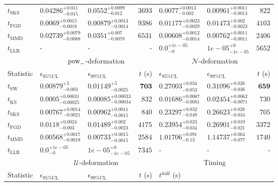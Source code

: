 \begin{tabular}{l|llr|llr}
	$t_{\mathrm{SKS}}$ & $0.04286_{-0.015}^{+0.011}$ & $0.0552_{-0.012}^{+0.0099}$ & $3693$ & $0.0077_{-0.002}^{+0.0013}$ & $0.00961_{-0.0013}^{+0.0011}$ & $822$ \\
	$t_{\mathrm{FGD}}$ & ${\mathbf{0.0069_{-0.0018}^{+0.0015}}}$ & ${\mathbf{0.00879_{-0.0014}^{+0.0013}}}$ & $9386$ & $0.01177_{-0.0029}^{+0.0023}$ & $0.01473_{-0.0023}^{+0.002}$ & $4103$ \\
	$t_{\mathrm{MMD}}$ & $0.02739_{-0.0088}^{+0.0079}$ & $0.0351_{-0.0078}^{+0.007}$ & $6531$ & $0.00608_{-0.0014}^{+0.0012}$ & $0.00762_{-0.0011}^{+0.0011}$ & $2406$ \\
	$t_{\mathrm{LLR}}$ & - & - & - & $0.0_{-0}^{+1e-05}$ & $1e-05_{-1e-05}^{+0}$ & $5652$ \\
	\toprule
	\multicolumn{1}{c}{} & \multicolumn{3}{c}{$\rm{pow}_{-}$-deformation} & \multicolumn{3}{c}{$\mathcal{N}$-deformation} \\
	Statistic & $\epsilon_{95\%\mathrm{CL}}$ & $\epsilon_{99\%\mathrm{CL}}$ & $t$ (s) & $\epsilon_{95\%\mathrm{CL}}$ & $\epsilon_{99\%\mathrm{CL}}$ & $t$ (s) \\
	\midrule
	$t_{\mathrm{SW}}$ & $0.00879_{-0.003}^{+5}$ & $0.01149_{-0.0025}^{+5}$ & ${\mathbf{703}}$ & $0.27003_{-0.053}^{+0.034}$ & $0.31096_{-0.036}^{+0.026}$ & ${\mathbf{659}}$ \\
	$t_{\overline{\mathrm{KS}}}$ & ${\mathbf{0.0005_{-0.00025}^{+0.00031}}}$ & ${\mathbf{0.00085_{-0.00034}^{+0.00033}}}$ & $832$ & ${\mathbf{0.01686_{-0.0081}^{+0.0067}}}$ & ${\mathbf{0.02454_{-0.0071}^{+0.0062}}}$ & $730$ \\
	$t_{\mathrm{SKS}}$ & $0.00767_{-0.0021}^{+0.0014}$ & $0.00962_{-0.0015}^{+0.0011}$ & $840$ & $0.23297_{-0.049}^{+0.032}$ & $0.26623_{-0.034}^{+0.028}$ & $705$ \\
	$t_{\mathrm{FGD}}$ & $0.0118_{-0.003}^{+0.0024}$ & $0.01489_{-0.0023}^{+0.002}$ & $4175$ & $0.23954_{-0.034}^{+0.023}$ & $0.26901_{-0.021}^{+0.019}$ & $3372$ \\
	$t_{\mathrm{MMD}}$ & $0.00568_{-0.0018}^{+0.0017}$ & $0.00733_{-0.0015}^{+0.0015}$ & $2584$ & $1.01706_{-0.13}^{+0.091}$ & $1.14737_{-0.077}^{+0.064}$ & $1740$ \\
	$t_{\mathrm{LLR}}$ & $0.0_{-0}^{+1e-05}$ & $1e-05_{-1e-05}^{+0}$ & $7345$ & - & - & - \\
	\toprule
	\multicolumn{1}{c}{} & \multicolumn{3}{c}{$\mathcal{U}$-deformation} & \multicolumn{3}{c}{Timing} \\
	Statistic & $\epsilon_{95\%\mathrm{CL}}$ & $\epsilon_{99\%\mathrm{CL}}$ & $t$ (s) & $t^{\mathrm{null}}$ (s) \\

\end{tabular}
